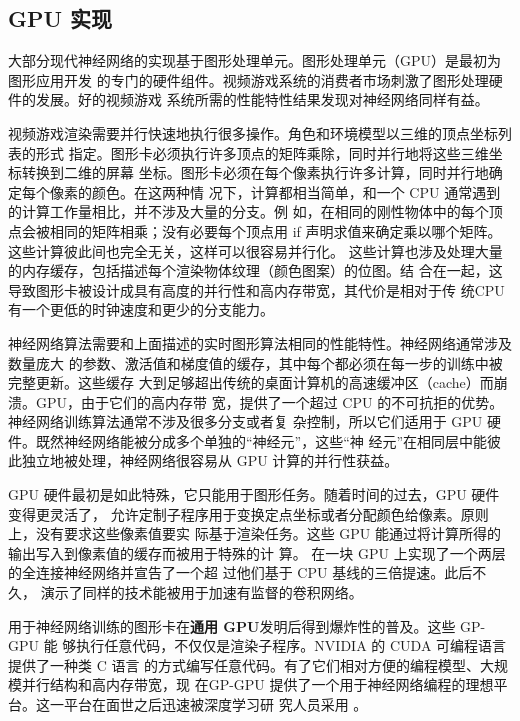 \subsection{GPU 实现}
\label{subsec:gpu_implementations}

大部分现代神经网络的实现基于图形处理单元。图形处理单元（GPU）是最初为图形应用开发
的专门的硬件组件。视频游戏系统的消费者市场刺激了图形处理硬件的发展。好的视频游戏
系统所需的性能特性结果发现对神经网络同样有益。

视频游戏渲染需要并行快速地执行很多操作。角色和环境模型以三维的顶点坐标列表的形式
指定。图形卡必须执行许多顶点的矩阵乘除，同时并行地将这些三维坐标转换到二维的屏幕
坐标。图形卡必须在每个像素执行许多计算，同时并行地确定每个像素的颜色。在这两种情
况下，计算都相当简单，和一个 CPU 通常遇到的计算工作量相比，并不涉及大量的分支。例
如，在相同的刚性物体中的每个顶点会被相同的矩阵相乘；没有必要每个顶点用 {\serif
  if} 声明求值来确定乘以哪个矩阵。这些计算彼此间也完全无关，这样可以很容易并行化。
这些计算也涉及处理大量的内存缓存，包括描述每个渲染物体纹理（颜色图案）的位图。结
合在一起，这导致图形卡被设计成具有高度的并行性和高内存带宽，其代价是相对于传
统CPU 有一个更低的时钟速度和更少的分支能力。

神经网络算法需要和上面描述的实时图形算法相同的性能特性。神经网络通常涉及数量庞大
的参数、激活值和梯度值的缓存，其中每个都必须在每一步的训练中被完整更新。这些缓存
大到足够超出传统的桌面计算机的高速缓冲区（cache）而崩溃。GPU，由于它们的高内存带
宽，提供了一个超过 CPU 的不可抗拒的优势。神经网络训练算法通常不涉及很多分支或者复
杂控制，所以它们适用于 GPU 硬件。既然神经网络能被分成多个单独的“神经元”，这些“神
经元”在相同层中能彼此独立地被处理，神经网络很容易从 GPU 计算的并行性获益。

GPU 硬件最初是如此特殊，它只能用于图形任务。随着时间的过去，GPU 硬件变得更灵活了，
允许定制子程序用于变换定点坐标或者分配颜色给像素。原则上，没有要求这些像素值要实
际基于渲染任务。这些 GPU 能通过将计算所得的输出写入到像素值的缓存而被用于特殊的计
算。\citet{using-gpus} 在一块 GPU 上实现了一个两层的全连接神经网络并宣告了一个超
过他们基于 CPU 基线的三倍提速。此后不久，\citet{high-performance-convolutional}
演示了同样的技术能被用于加速有监督的卷积网络。

用于神经网络训练的图形卡在\textbf{通用 GPU}发明后得到爆炸性的普及。这些 GP-GPU 能
够执行任意代码，不仅仅是渲染子程序。NVIDIA 的 CUDA 可编程语言提供了一种类 C 语言
的方式编写任意代码。有了它们相对方便的编程模型、大规模并行结构和高内存带宽，现
在GP-GPU 提供了一个用于神经网络编程的理想平台。这一平台在面世之后迅速被深度学习研
究人员采用 \citep{Raina:2009:LDU:1553374.1553486,Cireşan2012333}。


